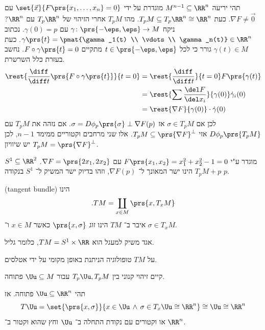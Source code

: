 \documentclass[a4paper,10pt,twoside,openany]{book}
\begin{document}
\begin{example}
תהי יריעה
$M^{n-1} \subseteq \RR^n$
מוגדרת על ידי
$\set{\vec{x}}{F\prs{x_1, \ldots, x_n} = 0}$
עם
$\nabla F \neq \vec{0}$.
כעת
$T_p M \subseteq T_p \RR^n \cong \RR^n$.
מהו
$T_p M$
אחרי הזיהוי של
$T_p\RR^n$
עם
$\RR^n$?
ניקח
$\gamma \colon \prs{-\eps, \eps} \to M$
עם
$\gamma(0) = p$.
נכתוב
$\gamma\prs{t} = \pmat{\gamma_1(t) \\ \vdots \\ \gamma_n(t)} \in \RR^n$.
כעת
$\gamma(t) \in M$
גורר כי לכל
$t \in \prs{-\eps, \eps}$
מתקיים
$F \circ \gamma\prs{t} = 0$.
נחשב בעזרת כלל השרשרת.
\begin{align*}
\rest{\frac{\diff}{\diff t}\prs{F \circ \gamma\prs{t}}}{t=0} &= \rest{\frac{\diff}{\diff t}}{t=0} F\prs{\gamma(t)} \\&=
\rest{\sum \frac{\del F}{\del x_i}}{\gamma(0)} \dot{\gamma}_i(0) \\&=
\rest{\nabla F}{\gamma(0)} \cdot \dot{\gamma}(0)
\end{align*}
לכן אם
$\sigma \in T_p M$
אז
$\sigma = D \phi_p\prs{\sigma} \perp \nabla F (p)$.
אם נזהה את
$T_pM$
עם
$D \phi_p \prs{T_p M}$
אזי
$T_p M \subseteq \prs{\nabla F}^{\perp}$.
אלו שני מרחבים וקטוריים ממימד
$n-1$,
לכן יש שיוויון
$T_p M  = \prs{\nabla F}^{\perp}$.
\end{example}
\begin{example}
$S^1 \subseteq \RR^2$
מוגדר ע"י
$F\prs{x_1, x_2} = x_1^2 + x_2^2 - 1 =0$
עם
$\nabla F = \prs{2x_1, 2x_2}$.
$T_p M + p$
הינו ישר המאונך ל־%
$\nabla F(p)$,
וזהו בדיוק ישר המשיק ל־%
$S^1$
בנקודה
$p$.
\end{example}
\begin{definition}
 \textenglish{(tangent bundle)}
הינו
\[\text{.}TM = \coprod_{x \in M} \prs{x,T_x M}\]
איבר ב־%
$TM$
הינו זוג
$\prs{x, \sigma}$
כאשר
$x \in M$
ו־%
$\sigma \in T_xM$.
\end{definition}
\begin{example}
אגד משיק למעגל הוא
$TM = S^1 \times \RR$,
כלומר גליל.
\end{example}
\begin{remark}
על
$TM$
טופולוגיה הניתנת באופן מקומי על ידי אטלסים.
\end{remark}
\begin{remark}
קיים זיהוי קנוני בין
$T_p \Uu, T_p M$
עבור
$\Uu \subseteq M$
פתוחה.
\end{remark}
\begin{example}
תהי
$\Uu \subseteq \RR^n$
פתוחה. אז
\[T\Uu = \set{\prs{x,\sigma}}{x \in \Uu \,\wedge\, \sigma \in T_x \Uu \cong \RR^n} \cong \Uu \cong \RR^n\]
או וקטורים עם נקודת התחלה ב־%
$\Uu$
וחץ שהוא וקטור ב־%
$\RR^n$.
\end{example}
\end{document}
